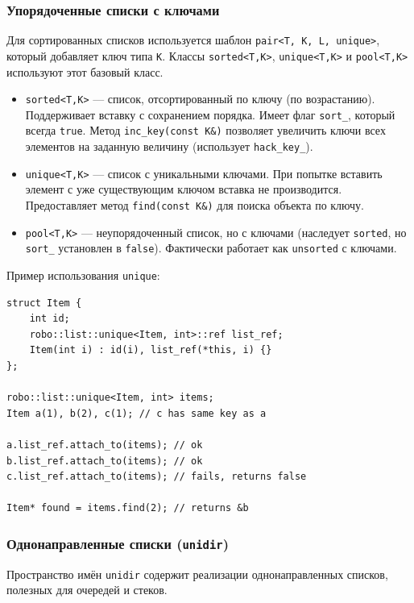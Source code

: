 \documentclass[a4paper,12pt]{article}
\begin{document}
\subsubsection{Упорядоченные списки с ключами}

Для сортированных списков используется шаблон \texttt{pair<T, K, L, unique>}, который добавляет ключ типа \texttt{K}. Классы \texttt{sorted<T,K>}, \texttt{unique<T,K>} и \texttt{pool<T,K>} используют этот базовый класс.

\begin{itemize}
    \item \texttt{sorted<T,K>} — список, отсортированный по ключу (по возрастанию). Поддерживает вставку с сохранением порядка. Имеет флаг \texttt{sort\_}, который всегда \texttt{true}. Метод \texttt{inc\_key(const K\&)} позволяет увеличить ключи всех элементов на заданную величину (использует \texttt{hack\_key\_}).
    \item \texttt{unique<T,K>} — список с уникальными ключами. При попытке вставить элемент с уже существующим ключом вставка не производится. Предоставляет метод \texttt{find(const K\&)} для поиска объекта по ключу.
    \item \texttt{pool<T,K>} — неупорядоченный список, но с ключами (наследует \texttt{sorted}, но \texttt{sort\_} установлен в \texttt{false}). Фактически работает как \texttt{unsorted} с ключами.
\end{itemize}

Пример использования \texttt{unique}:

\begin{lstlisting}[caption={Список с уникальными ключами}]
struct Item {
    int id;
    robo::list::unique<Item, int>::ref list_ref;
    Item(int i) : id(i), list_ref(*this, i) {}
};

robo::list::unique<Item, int> items;
Item a(1), b(2), c(1); // c has same key as a

a.list_ref.attach_to(items); // ok
b.list_ref.attach_to(items); // ok
c.list_ref.attach_to(items); // fails, returns false

Item* found = items.find(2); // returns &b
\end{lstlisting}

\subsubsection{Однонаправленные списки (\texttt{unidir})}

Пространство имён \texttt{unidir} содержит реализации однонаправленных списков, полезных для очередей и стеков.
\end{document}
